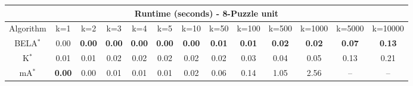 \begin{tabular}{c|cccccccccccc}\toprule
\multicolumn{13}{c}{Runtime (seconds) - 8-Puzzle unit}\\ \midrule
Algorithm & k=1 & k=2 & k=3 & k=4 & k=5 & k=10 & k=50 & k=100 & k=500 & k=1000 & k=5000 & k=10000 \\ \midrule
BELA$^*$ & 0.00 & \textbf{0.00} & \textbf{0.00} & \textbf{0.00} & \textbf{0.00} & \textbf{0.00} & \textbf{0.01} & \textbf{0.01} & \textbf{0.02} & \textbf{0.02} & \textbf{0.07} & \textbf{0.13} \\
K$^*$ & 0.01 & 0.01 & 0.02 & 0.02 & 0.02 & 0.02 & 0.02 & 0.03 & 0.04 & 0.05 & 0.13 & 0.21 \\
mA$^*$ & \textbf{0.00} & 0.00 & 0.01 & 0.01 & 0.01 & 0.02 & 0.06 & 0.14 & 1.05 & 2.56 & -- & -- \\ \bottomrule 
\end{tabular}
